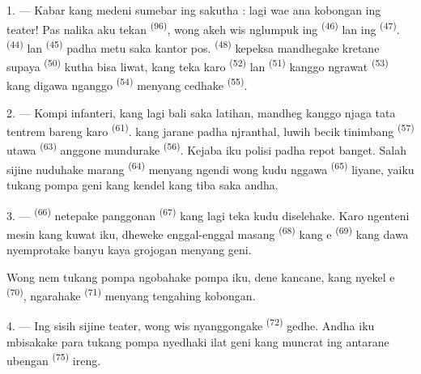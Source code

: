 1. --- Kabar kang medeni sumebar ing sakutha : lagi wae ana kobongan
ing teater! Pas nalika aku tekan 
\textsuperscript{(96)}, wong akeh wis nglumpuk ing 
\textsuperscript{(46)} lan ing  \textsuperscript{(47)}.
 \textsuperscript{(44)} lan 
\textsuperscript{(45)} padha metu saka kantor pos. 
\textsuperscript{(48)} kepeksa mandhegake kretane supaya  \textsuperscript{(50)} kutha bisa liwat, kang teka karo
 \textsuperscript{(52)} lan 
\textsuperscript{(51)} kanggo ngrawat 
\textsuperscript{(53)} kang digawa nganggo 
\textsuperscript{(54)} menyang cedhake 
\textsuperscript{(55)}.

2. --- Kompi infanteri, kang lagi bali saka latihan, mandheg kanggo
njaga tata tentrem bareng karo  \textsuperscript{(61)}.  kang
jarane padha njranthal, luwih becik tinimbang 
\textsuperscript{(57)} utawa  \textsuperscript{(63)}
anggone mundurake 
\textsuperscript{(56)}. Kejaba iku polisi padha repot banget. Salah
sijine nuduhake marang  \textsuperscript{(64)}
menyang ngendi wong kudu nggawa  \textsuperscript{(65)}
liyane, yaiku tukang pompa geni kang kendel kang tiba saka andha.

3. ---  \textsuperscript{(66)} netepake panggonan
 \textsuperscript{(67)} kang lagi teka kudu diselehake.
Karo ngenteni mesin kang kuwat iku, dheweke enggal-enggal masang
 \textsuperscript{(68)} kang e
\textsuperscript{(69)} kang dawa nyemprotake banyu kaya grojogan menyang
geni.

Wong nem tukang pompa ngobahake pompa iku, dene kancane, kang nyekel
e \textsuperscript{(70)}, ngarahake 
\textsuperscript{(71)} menyang tengahing kobongan.

4. --- Ing sisih sijine teater, wong wis nyanggongake 
\textsuperscript{(72)} gedhe. Andha iku mbisakake para tukang pompa
nyedhaki ilat geni kang muncrat ing antarane ubengan 
\textsuperscript{(75)} ireng.

\VUsaut{5.0mm}
\VUsaut{3.4mm}


